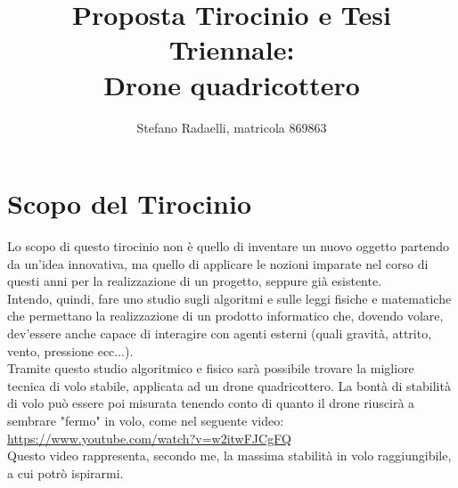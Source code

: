 \documentclass[]{article}
\begin{document}
\title{Proposta Tirocinio e Tesi Triennale:\\Drone quadricottero}
\author{Stefano Radaelli, matricola 869863}
\maketitle

\section{Scopo del Tirocinio}
Lo scopo di questo tirocinio non è quello di inventare un nuovo oggetto partendo da un'idea innovativa, ma quello di applicare le nozioni imparate nel corso di questi anni per la realizzazione di un progetto, seppure già esistente.\\Intendo, quindi, fare uno studio sugli algoritmi e sulle leggi fisiche e matematiche che permettano la realizzazione di un prodotto informatico che, dovendo volare, dev'essere anche capace di interagire con agenti esterni (quali gravità, attrito, vento, pressione ecc...).\\ Tramite questo studio algoritmico e fisico sarà possibile trovare la migliore tecnica di volo stabile, applicata ad un drone quadricottero. La bontà di stabilità di volo può essere poi misurata tenendo conto di quanto il drone riuscirà a sembrare "fermo" in volo, come nel seguente video: \\
\url{https://www.youtube.com/watch?v=w2itwFJCgFQ}\\ Questo video rappresenta, secondo me, la massima stabilità in volo raggiungibile, a cui potrò ispirarmi.
\end{document}
